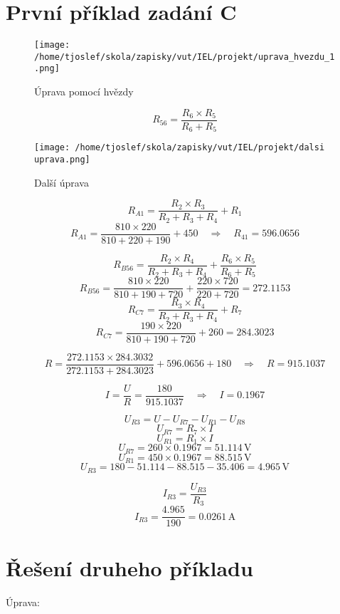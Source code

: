 \documentclass{article}
\begin{document}
\sloppy

\section{První příklad zadání C}

\begin{figure}[!ht]
  \centering
  \texttt{[image: /home/tjoslef/skola/zapisky/vut/IEL/projekt/uprava\_hvezdu\_1.png]}
  \caption{Úprava pomocí hvězdy}
  \label{fig:hvezda}
\end{figure}

\[
    R_{56} = \frac{R_6 \times R_5}{R_6 + R_5}
\]

\begin{figure}[!ht]
  \centering
  \texttt{[image: /home/tjoslef/skola/zapisky/vut/IEL/projekt/dalsi uprava.png]}
  \caption{Další úprava}
  \label{fig:dalsi_uprava}
\end{figure}

\[
R_{A1} = \frac{R_2 \times R_3}{R_2 + R_3 + R_4} + R_1
\]
\[
    R_{A1} = \frac{810 \times 220}{810 + 220 + 190} + 450 \quad \Rightarrow \quad R_{41} = 596.0656
\]

\[
R_{B56} = \frac{R_2 \times R_4}{R_2 + R_3 + R_4} + \frac{R_6 \times R_5}{R_6 + R_5}
\]
\[
R_{B56} = \frac{810 \times 220}{810 + 190 + 720} + \frac{220 \times 720}{220 + 720}
= 272.1153
\]
\[
R_{C7} = \frac{R_3 \times R_4}{R_2 + R_3 + R_4} + R_7
\]
\[
R_{C7} = \frac{190 \times 220}{810 + 190 + 720} + 260 = 284.3023
\]

\[
R  = \frac{272.1153 \times 284.3032}{272.1153 + 284.3023} + 596.0656 + 180 \quad \Rightarrow \quad R = 915.1037
\]

\[
I = \frac{U}{R} = \frac{180}{915.1037} \quad \Rightarrow \quad I = 0.1967
\]

\[
    U_{R3} = U - U_{R7} - U_{R1} - U_{R8}
\]
\[
U_{R7} = R_7 \times I
\]
\[
    U_{R1} = R_1 \times I
\]
\[
U_{R7} = 260 \times 0.1967 = 51.114 \, \text{V}
\]
\[
    U_{R1} = 450 \times 0.1967 = 88.515 \, \text{V}
\]
\[
U_{R3}  = 180 - 51.114 - 88.515 - 35.406  = 4.965 \, \text{V}
\]

\[
I_{R3} = \frac{U_{R3}}{R_3}
\]
\[
I_{R3} = \frac{4.965}{190} = 0.0261 \, \text{A}
\]

\clearpage
\section{Řešení druheho příkladu}
Úprava:
\end{document}
